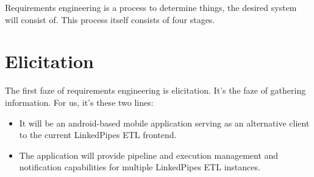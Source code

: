 Requirements engineering is a process to determine things, the desired system will consist of. This process itself consists of four stages.

\section{Elicitation}
The first faze of requirements engineering is elicitation. It's the faze of gathering information.
For us, it's these two lines:
\begin{itemize}
    \item It will be an android-based mobile application serving as an alternative client to the current LinkedPipes ETL frontend.
    \item The application will provide pipeline and execution management and notification capabilities for multiple LinkedPipes ETL instances.
\end{itemize}

